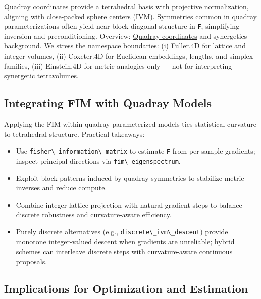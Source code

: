 \documentclass[
  10pt,
]{article}
\newcommand{\passthrough}[1]{#1}
\providecommand{\tightlist}{%
  \setlength{\itemsep}{0pt}\setlength{\parskip}{0pt}}
\begin{document}
Quadray coordinates provide a tetrahedral basis with projective
normalization, aligning with close-packed sphere centers (IVM).
Symmetries common in quadray parameterizations often yield near
block-diagonal structure in \passthrough{\lstinline!F!}, simplifying
inversion and preconditioning. Overview:
\href{https://en.wikipedia.org/wiki/Quadray_coordinates}{Quadray
coordinates} and synergetics background. We stress the namespace
boundaries: (i) Fuller.4D for lattice and integer volumes, (ii)
Coxeter.4D for Euclidean embeddings, lengths, and simplex families,
(iii) Einstein.4D for metric analogies only --- not for interpreting
synergetic tetravolumes.

\hypertarget{integrating-fim-with-quadray-models}{%
\subsection{Integrating FIM with Quadray
Models}\label{integrating-fim-with-quadray-models}}

Applying the FIM within quadray-parameterized models ties statistical
curvature to tetrahedral structure. Practical takeaways:

\begin{itemize}
\tightlist
\item
  Use \passthrough{\lstinline!fisher\_information\_matrix!} to estimate
  \passthrough{\lstinline!F!} from per-sample gradients; inspect
  principal directions via \passthrough{\lstinline!fim\_eigenspectrum!}.
\item
  Exploit block patterns induced by quadray symmetries to stabilize
  metric inverses and reduce compute.
\item
  Combine integer-lattice projection with natural-gradient steps to
  balance discrete robustness and curvature-aware efficiency.
\item
  Purely discrete alternatives (e.g.,
  \passthrough{\lstinline!discrete\_ivm\_descent!}) provide monotone
  integer-valued descent when gradients are unreliable; hybrid schemes
  can interleave discrete steps with curvature-aware continuous
  proposals.
\end{itemize}

\hypertarget{implications-for-optimization-and-estimation}{%
\subsection{Implications for Optimization and
Estimation}\label{implications-for-optimization-and-estimation}}
\end{document}
